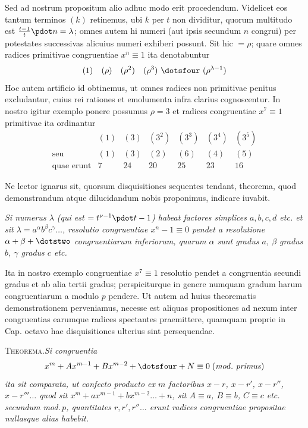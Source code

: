 Sed ad nostrum propositum alio adhuc modo erit procedendum. Videlicet eos tantum terminos $(k)$ retinemus, ubi $k$ per $t$ non dividitur, quorum multitudo est $\frac{t-1}{t}\pdot n=\lambda$; omnes autem hi numeri (aut ipsis secundum $n$ congrui) per potestates successivas alicuius numeri exhiberi possunt. Sit hic $=\rho$; quare omnes radices primitivae congruentiae $x^n\equiv1$ ita denotabuntur
\[
(1)\quad(\rho)\quad(\rho^2)\quad(\rho^3)\ \dotsfour\ (\rho^{\lambda-1})
\]
Hoc autem artificio id obtinemus, ut omnes radices non primitivae penitus excludantur, cuius rei rationes et emolumenta infra clarius cognoscentur. In nostro igitur exemplo ponere possumus $\rho=3$ et radices congruentiae $x^7\equiv1$ primitivae ita ordinantur
\[
\begin{array}{rcccccc}
&(1)&(3)&(3^2)&(3^3)&(3^4)&(3^5)\\
\text{seu}&(1)&(3)&(2)&(6)&(4)&(5)\\
\text{quae erunt}&7&24&20&25&23&16
\end{array}
\]

Ne lector ignarus sit, quorsum disquisitiones sequentes tendant, theorema, quod demonstrandum atque dilucidandum nobis proponimus, indicare iuvabit.

\emph{Si numerus $\lambda$ (qui est $=t^{\nu-1}\pdot t-1$) habeat factores simplices $a,b,c,d$ etc. et sit $\lambda=a^\alpha b^\beta c^\gamma\ldots$, resolutio congruentiae $x^n-1\equiv0$ pendet a resolutione $\alpha+\beta+\dotstwo$ congruentiarum inferiorum, quarum $\alpha$ sunt gradus $a$, $\beta$ gradus $b$, $\gamma$ gradus $c$ etc.}

Ita in nostro exemplo congruentiae $x^7\equiv1$ resolutio pendet a congruentia secundi gradus et ab alia tertii gradus; perspiciturque in genere numquam gradum harum congruentiarum a modulo $p$ pendere. Ut autem ad huius theorematis demonstrationem perveniamus, necesse est aliquas propositiones ad nexum inter congruentias earumque radices spectantes praemittere, quamquam proprie in Cap. octavo hae disquisitiones ulterius sint persequendae.

\textsc{Theorema.}\quad\emph{Si congruentia}
\[
x^m+Ax^{m-1}+Bx^{m-2}+\dotsfour+N\equiv0\;(\mathit{mod.\ primus})
\]
\emph{ita sit comparata, ut confecto producto ex $m$ factoribus $x-r$, $x-r'$, $x-r''$, $x-r'''\ldots$ quod sit $x^m+ax^{m-1}+bx^{m-2}\ldots+n$, sit $A\equiv a$, $B\equiv b$, $C\equiv c$ etc. secundum mod.\,$p$, quantitates $r,r',r''\ldots$ erunt radices congruentiae propositae nullasque alias habebit.}

